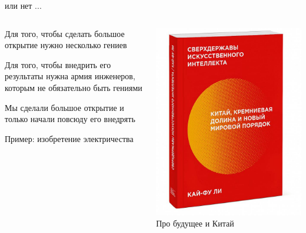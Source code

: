 \documentclass[notes,12pt, aspectratio=169]{beamer}
\newenvironment{wideitemize}{\itemize\addtolength{\itemsep}{10pt}}{\enditemize}
\begin{document}
\begin{frame}{или нет ... }
\begin{columns}
\begin{column}{0.6\textwidth}
	\begin{wideitemize}
		\item  Для того, чтобы сделать большое открытие нужно несколько гениев
		\item  Для того, чтобы внедрить его результаты нужна армия инженеров, которым не обязательно быть гениями
		\item  Мы сделали большое открытие и только начали повсюду его внедрять
		\item \alert{Пример:} изобретение электричества
	\end{wideitemize}
\end{column}
\hfill%
\begin{column}{0.4\textwidth}
		\begin{center}
			\includegraphics[width=.7\linewidth]{book_ch.jpg} \\
			\footnotesize Про будущее и Китай
		\end{center}
\end{column}
\end{columns}
\end{frame}
\end{document}
